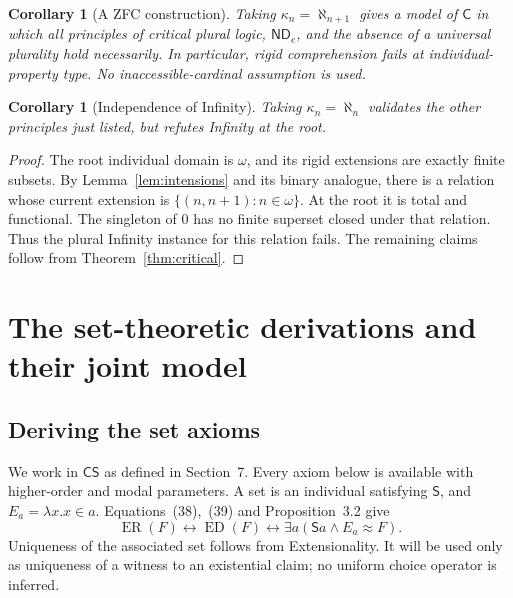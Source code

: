 \documentclass[11pt]{article}
\newtheorem{corollary}[theorem]{Corollary}
\theoremstyle{definition}
\newcommand{\ED}{\operatorname{ED}}
\newcommand{\ER}{\operatorname{ER}}
\newcommand{\C}{\mathsf C}
\newcommand{\rel}{\mathbin{\approx}}
\newcommand{\ND}{\mathsf{ND}_e}
\numberwithin{equation}{section}
\begin{document}
\begin{corollary}[A ZFC construction]\label{cor:modelzfc}
Taking $\kappa_n=\aleph_{n+1}$ gives a model of $\C$ in which all principles of critical plural logic, $\ND$, and the absence of a universal plurality hold necessarily. In particular, rigid comprehension fails at individual-property type. No inaccessible-cardinal assumption is used.
\end{corollary}

\begin{corollary}[Independence of Infinity]\label{cor:noinfinity}
Taking $\kappa_n=\aleph_n$ validates the other principles just listed, but refutes Infinity at the root.
\end{corollary}
\begin{proof}
The root individual domain is $\omega$, and its rigid extensions are exactly finite subsets. By Lemma~\ref{lem:intensions} and its binary analogue, there is a relation whose current extension is $\{(n,n+1):n\in\omega\}$. At the root it is total and functional. The singleton of $0$ has no finite superset closed under that relation. Thus the plural Infinity instance for this relation fails. The remaining claims follow from Theorem~\ref{thm:critical}.
\end{proof}

\section{The set-theoretic derivations and their joint model}\label{app:sets}

\subsection{Deriving the set axioms}

We work in $\mathsf{CS}$ as defined in Section~7. Every axiom below is available with higher-order and modal parameters. A set is an individual satisfying $\mathsf S$, and $E_a=\lambda x.x\in a$. Equations~\textup{(38)},~\textup{(39)} and Proposition~3.2 give
$$
\ER(F)\leftrightarrow\ED(F)\leftrightarrow
\exists a(\mathsf Sa\wedge E_a\rel F).
$$
Uniqueness of the associated set follows from Extensionality. It will be used only as uniqueness of a witness to an existential claim; no uniform choice operator is inferred.
\end{document}
